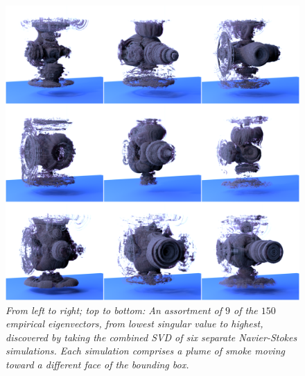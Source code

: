 \documentclass[11pt]{article}
\begin{document}
\begin{figure}
	\centering
	\includegraphics[width=\textwidth]{Figures/modes/montage_recolored.png}
	\caption{\em From left to right; top to bottom: An assortment of $9$ of the $150$ empirical eigenvectors, from lowest singular value to highest,  discovered by taking the combined SVD of six separate Navier-Stokes simulations. Each simulation comprises a plume of smoke moving toward a different face of the bounding box.}
	\label{fig:eigs}
\end{figure}
\end{document}
